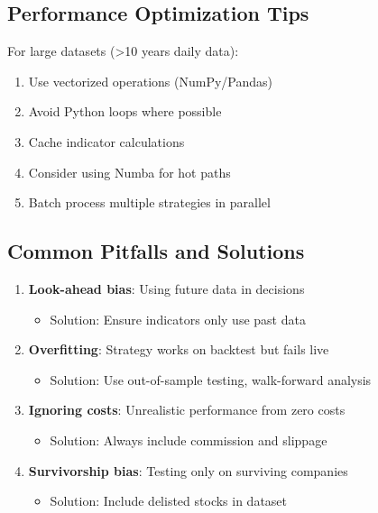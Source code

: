 \documentclass[11pt,a4paper]{article}
\begin{document}
\subsection{Performance Optimization Tips}

\begin{warning}
For large datasets (>10 years daily data):
\begin{enumerate}
  \item Use vectorized operations (NumPy/Pandas)
  \item Avoid Python loops where possible
  \item Cache indicator calculations
  \item Consider using Numba for hot paths
  \item Batch process multiple strategies in parallel
\end{enumerate}
\end{warning}

\subsection{Common Pitfalls and Solutions}

\begin{enumerate}
  \item \textbf{Look-ahead bias}: Using future data in decisions
  \begin{itemize}
    \item Solution: Ensure indicators only use past data
  \end{itemize}
  
  \item \textbf{Overfitting}: Strategy works on backtest but fails live
  \begin{itemize}
    \item Solution: Use out-of-sample testing, walk-forward analysis
  \end{itemize}
  
  \item \textbf{Ignoring costs}: Unrealistic performance from zero costs
  \begin{itemize}
    \item Solution: Always include commission and slippage
  \end{itemize}
  
  \item \textbf{Survivorship bias}: Testing only on surviving companies
  \begin{itemize}
    \item Solution: Include delisted stocks in dataset
  \end{itemize}
\end{enumerate}
\end{document}
